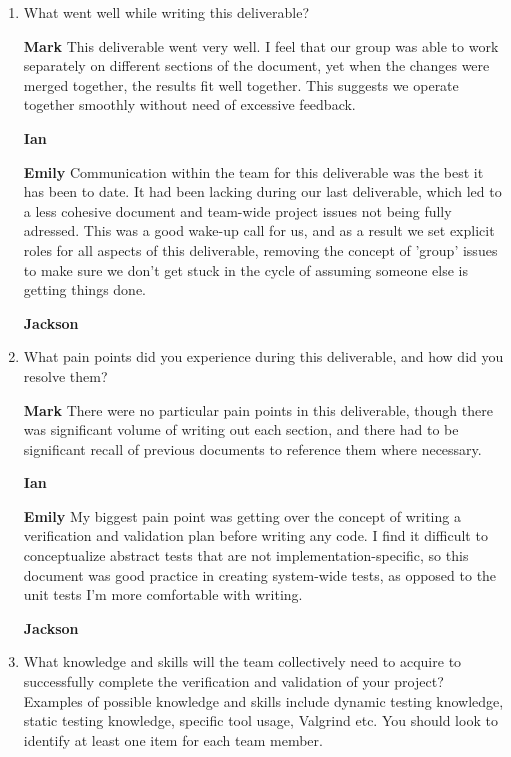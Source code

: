 \documentclass[12pt, titlepage]{article}
\begin{document}
\begin{enumerate}[leftmargin=*]
  \item What went well while writing this deliverable?
  
  \textbf{Mark} This deliverable went very well. I feel that our group was able to work separately on 
  different sections of the document, yet when the changes were merged together, the results fit well 
  together. This suggests we operate together smoothly without need of excessive feedback.

  \textbf{Ian}

  \textbf{Emily} Communication within the team for this deliverable was the best it has been to date. 
  It had been lacking during our last deliverable, which led to a less cohesive document and team-wide
  project issues not being fully adressed. This was a good wake-up call for us, and as a result we set
  explicit roles for all aspects of this deliverable, removing the concept of 'group' issues to make 
  sure we don't get stuck in the cycle of assuming someone else is getting things done.

  \textbf{Jackson}
  
  \item What pain points did you experience during this deliverable, and how
    did you resolve them?

  \textbf{Mark} There were no particular pain points in this deliverable, though there was significant 
  volume of writing out each section, and there had to be significant recall of previous documents to 
  reference them where necessary.

  \textbf{Ian}

  \textbf{Emily} My biggest pain point was getting over the concept of writing a verification and 
  validation plan before writing any code. I find it difficult to conceptualize abstract tests that are 
  not implementation-specific, so this document was good practice in creating system-wide tests, as 
  opposed to the unit tests I'm more comfortable with writing.

  \textbf{Jackson} 

  \item What knowledge and skills will the team collectively need to acquire to
  successfully complete the verification and validation of your project?
  Examples of possible knowledge and skills include dynamic testing knowledge,
  static testing knowledge, specific tool usage, Valgrind etc.  You should look to
  identify at least one item for each team member. 


\end{enumerate}
\end{document}
